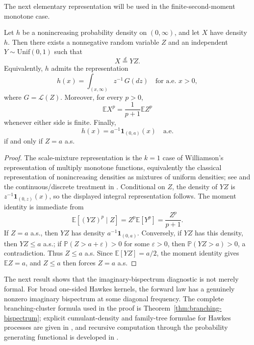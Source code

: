 \documentclass[aap,press]{apt} \volno{00} \partno{00}
\newcommand{\E}{\mathbb{E}}
\newcommand{\PP}{\mathbb{P}}
\newcommand{\1}{\mathbf{1}}
\newcommand{\Law}{\mathcal{L}}
\numberwithin{equation}{section}
\begin{document}
The next elementary representation will be used in the finite-second-moment monotone case.

\begin{lem}\label{lem:uniform-mixture}
Let $h$ be a nonincreasing probability density on $(0,\infty)$, and let $X$ have density $h$. Then there exists a nonnegative random variable $Z$ and an independent $Y\sim\mathrm{Unif}(0,1)$ such that
\[
X\stackrel d=YZ.
\]
Equivalently, $h$ admits the representation
\[
h(x)=\int_{(x,\infty)} z^{-1}\,G(dz)
\quad\text{for a.e. }x>0,
\]
where $G=\Law(Z)$. Moreover, for every $p>0$,
\[
\E X^p=\frac{1}{p+1}\E Z^p
\]
whenever either side is finite. Finally,
\[
h(x)=a^{-1}\1_{(0,a)}(x)\quad\text{a.e.}
\]
if and only if $Z=a$ a.s.
\end{lem}

\begin{proof}
The scale-mixture representation is the $k=1$ case of Williamson's representation of multiply monotone functions, equivalently the classical representation of nonincreasing densities as mixtures of uniform densities; see \cite{Williamson1956} and the continuous/discrete treatment in \cite{Lefevre_and_Loisel2013}. Conditional on $Z$, the density of $YZ$ is $z^{-1}\1_{(0,z)}(x)$, so the displayed integral representation follows. The moment identity is immediate from
\[
\E[(YZ)^p\mid Z]=Z^p\E[Y^p]=\frac{Z^p}{p+1}.
\]
If $Z=a$ a.s., then $YZ$ has density $a^{-1}\1_{(0,a)}$. Conversely, if $YZ$ has this density, then $YZ\le a$ a.s.; if $\PP(Z>a+\varepsilon)>0$ for some $\varepsilon>0$, then $\PP(YZ>a)>0$, a contradiction. Thus $Z\le a$ a.s. Since $\E[YZ]=a/2$, the moment identity gives $\E Z=a$, and $Z\le a$ then forces $Z=a$ a.s.
\end{proof}

The next result shows that the imaginary-bispectrum diagnostic is not merely formal. For broad one-sided Hawkes kernels, the forward law has a genuinely nonzero imaginary bispectrum at some diagonal frequency. The complete branching-cluster formula used in the proof is Theorem~\ref{thm:branching-bispectrum}; explicit cumulant-density and family-tree formulae for Hawkes processes are given in \cite{JovanovicHertzRotter2015}, and recursive computation through the probability generating functional is developed in \cite{Privault2021}.
\end{document}
